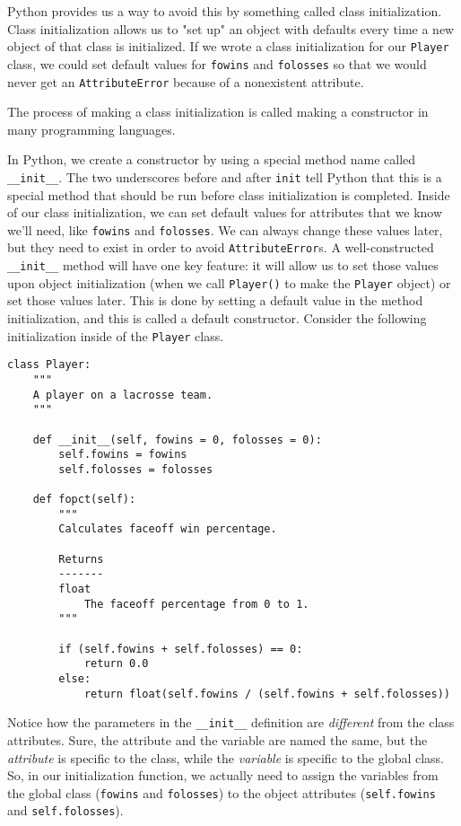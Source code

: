 Python provides us a way to avoid this by something called class initialization. Class initialization allows us to "set up" an object with defaults every time a new object of that class is initialized. If we wrote a class initialization for our \verb|Player| class, we could set default values for \verb|fowins| and \verb|folosses| so that we would never get an \verb|AttributeError| because of a nonexistent attribute.\par
The process of making a class initialization is called making a constructor in many programming languages.\par
In Python, we create a constructor by using a special method name called \verb|__init__|. The two underscores before and after \verb|init| tell Python that this is a special method that should be run before class initialization is completed. Inside of our class initialization, we can set default values for attributes that we know we'll need, like \verb|fowins| and \verb|folosses|. We can always change these values later, but they need to exist in order to avoid \verb|AttributeError|s. A well-constructed \verb|__init__| method will have one key feature: it will allow us to set those values upon object initialization (when we call \verb|Player()| to make the \verb|Player| object) or set those values later. This is done by setting a default value in the method initialization, and this is called a default constructor. Consider the following initialization inside of the \verb|Player| class.\par
\begin{lstlisting}[style=pippython]
class Player:
	"""
	A player on a lacrosse team.
	"""
	
	def __init__(self, fowins = 0, folosses = 0):
		self.fowins = fowins
		self.folosses = folosses

	def fopct(self):
		"""
		Calculates faceoff win percentage.
		
		Returns
		-------
		float
			The faceoff percentage from 0 to 1.
		"""
		
		if (self.fowins + self.folosses) == 0:
			return 0.0
		else:
			return float(self.fowins / (self.fowins + self.folosses))
\end{lstlisting}
Notice how the parameters in the \verb|__init__| definition are \textit{different} from the class attributes. Sure, the attribute and the variable are named the same, but the \textit{attribute} is specific to the class, while the \textit{variable} is specific to the global class. So, in our initialization function, we actually need to assign the variables from the global class (\verb|fowins| and \verb|folosses|) to the object attributes (\verb|self.fowins| and \verb|self.folosses|).\par
